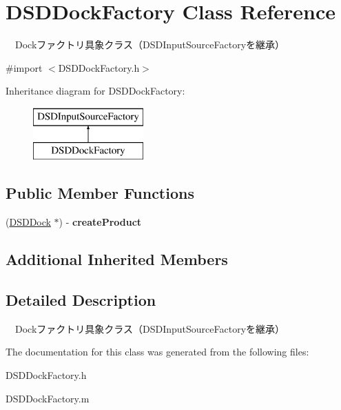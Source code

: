 \hypertarget{interface_d_s_d_dock_factory}{\section{D\-S\-D\-Dock\-Factory Class Reference}
\label{interface_d_s_d_dock_factory}
}


　\-Dockファクトリ具象クラス（\-D\-S\-D\-Input\-Source\-Factoryを継承）  




{\ttfamily \#import $<$D\-S\-D\-Dock\-Factory.\-h$>$}

Inheritance diagram for D\-S\-D\-Dock\-Factory\-:\begin{figure}[H]
\begin{center}
\leavevmode
\includegraphics[height=2.000000cm]{interface_d_s_d_dock_factory}
\end{center}
\end{figure}
\subsection*{Public Member Functions}
\begin{DoxyCompactItemize}
\item 
\hypertarget{interface_d_s_d_dock_factory_ad5cda95f07c0f78aee129cd5ed5ce6fa}{(\hyperlink{interface_d_s_d_dock}{D\-S\-D\-Dock} $\ast$) -\/ {\bfseries create\-Product}}\label{interface_d_s_d_dock_factory_ad5cda95f07c0f78aee129cd5ed5ce6fa}

\end{DoxyCompactItemize}
\subsection*{Additional Inherited Members}


\subsection{Detailed Description}
　\-Dockファクトリ具象クラス（\-D\-S\-D\-Input\-Source\-Factoryを継承） 

The documentation for this class was generated from the following files\-:\begin{DoxyCompactItemize}
\item 
D\-S\-D\-Dock\-Factory.\-h\item 
D\-S\-D\-Dock\-Factory.\-m\end{DoxyCompactItemize}

